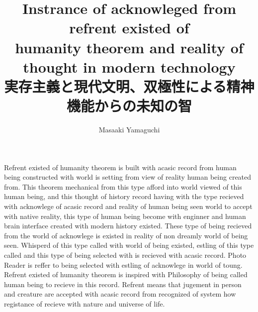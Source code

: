 \documentclass{jsarticle}
\begin{document}
\title{Instrance of acknowleged from refrent existed of \\
       humanity theorem and reality of thought in modern technology \\
       実存主義と現代文明、双極性による精神機能からの未知の智}
\author{Masaaki Yamaguchi}
\date{}
\maketitle

  Refrent existed of humanity theorem is built with acasic record from human being constructed with
world is setting from view of reality human being created from. This theorem mechanical from this type
afford into world viewed of this human being, and this thought of history record having with the type
recieved with acknowlege of acasic record and reality of human being seen world to accept with native reality,
this type of human being become with enginner and human brain interface created with modern history existed.
These type of being recieved from the world of acknowlege is existed in reality of non dreamly world of being
seen. Whisperd of this type called with world of being existed, estling of this type called and this type
of being selected with is recieved with acasic record. Photo Reader is reffer to being selected with estling
of acknowlege in world of toung. Refrent existed of humanity theorem is inspired with Philosophy of being called
human being to recieve in this record. 
Refrent means that jugement in person and creature are accepted with acasic record from recognized
of system how registance of recieve with nature and universe of life.
\end{document}
